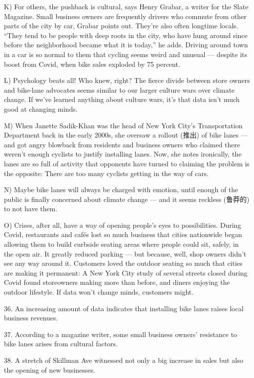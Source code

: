 \documentclass[UTF8,11pt]{ctexart}
\begin{document}
K) For others, the pushback is cultural, says Henry Grabar, a writer for the Slate Magazine. Small business owners are frequently drivers who commute from other parts of the city by car, Grabar points out. They’re also often longtime locals. “They tend to be people with deep roots in the city, who have hung around since before the neighborhood became what it is today,” he adds. Driving around town in a car is so normal to them that cycling seems weird and unusual — despite its boost from Covid, when bike sales exploded by 75 percent.


L) Psychology beats all! Who knew, right? The fierce divide between store owners and bike-lane advocates seems similar to our larger culture wars over climate change. If we’ve learned anything about culture wars, it’s that data isn’t much good at changing minds.


M) When Janette Sadik-Khan was the head of New York City’s Transportation Department back in the early 2000s, she oversaw a rollout (推出) of bike lanes — and got angry blowback from residents and business owners who claimed there weren’t enough cyclists to justify installing lanes. Now, she notes ironically, the lanes are so full of activity that opponents have turned to claiming the problem is the opposite: There are too many cyclists getting in the way of cars.


N) Maybe bike lanes will always be charged with emotion, until enough of the public is finally concerned about climate change — and it seems reckless (鲁莽的) to not have them.


O) Crises, after all, have a way of opening people’s eyes to possibilities. During Covid, restaurants and cafés lost so much business that cities nationwide began allowing them to build curbside seating areas where people could sit, safely, in the open air. It greatly reduced parking — but because, well, shop owners didn’t see any way around it. Customers loved the outdoor seating so much that cities are making it permanent: A New York City study of several streets closed during Covid found storeowners making more than before, and diners enjoying the outdoor lifestyle. If data won’t change minds, customers might.


36. An increasing amount of data indicates that installing bike lanes raises local business revenues.


37. According to a magazine writer, some small business owners’ resistance to bike lanes arises from cultural factors.


38. A stretch of Skillman Ave witnessed not only a big increase in sales but also the opening of new businesses.
\end{document}
